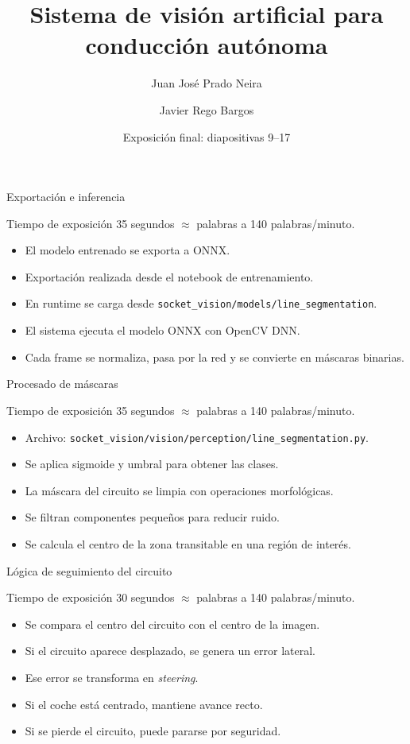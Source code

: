 \documentclass[aspectratio=169]{beamer}
\title{Sistema de visi\'on artificial para conducci\'on aut\'onoma}
\author{Juan Jos\'e Prado Neira \and Javier Rego Bargos}
\date{Exposici\'on final: diapositivas 9--17}
\newcommand{\timing}[2]{%
  \begin{block}{Tiempo de exposici\'on}
  \small #1 segundos \quad $\approx$ \quad #2 palabras a 140 palabras/minuto.
  \end{block}
}
\begin{document}
\setcounter{framenumber}{8}

\begin{frame}{Exportaci\'on e inferencia}
\timing{35}{82}
\begin{itemize}
  \item El modelo entrenado se exporta a ONNX.
  \item Exportaci\'on realizada desde el notebook de entrenamiento.
  \item En runtime se carga desde \texttt{socket\_vision/models/line\_segmentation}.
  \item El sistema ejecuta el modelo ONNX con OpenCV DNN.
  \item Cada frame se normaliza, pasa por la red y se convierte en m\'ascaras binarias.
\end{itemize}
\end{frame}

\begin{frame}{Procesado de m\'ascaras}
\timing{35}{82}
\begin{itemize}
  \item Archivo: \texttt{socket\_vision/vision/perception/line\_segmentation.py}.
  \item Se aplica sigmoide y umbral para obtener las clases.
  \item La m\'ascara del circuito se limpia con operaciones morfol\'ogicas.
  \item Se filtran componentes peque\~nos para reducir ruido.
  \item Se calcula el centro de la zona transitable en una regi\'on de inter\'es.
\end{itemize}
\end{frame}

\begin{frame}{L\'ogica de seguimiento del circuito}
\timing{30}{70}
\begin{itemize}
  \item Se compara el centro del circuito con el centro de la imagen.
  \item Si el circuito aparece desplazado, se genera un error lateral.
  \item Ese error se transforma en \textit{steering}.
  \item Si el coche est\'a centrado, mantiene avance recto.
  \item Si se pierde el circuito, puede pararse por seguridad.
\end{itemize}
\end{frame}
\end{document}
